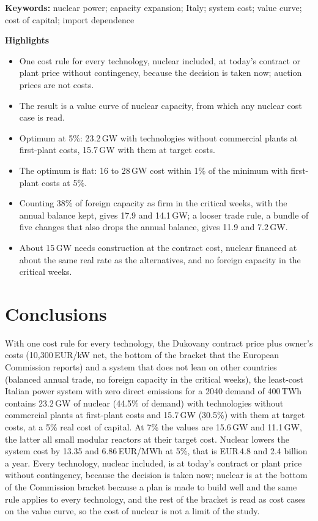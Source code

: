 \documentclass[11pt,a4paper]{article}
\begin{document}
\noindent\textbf{Keywords:} nuclear power; capacity expansion; Italy; system cost; value curve; cost of capital; import dependence

\medskip
\noindent\textbf{Highlights}
\begin{itemize}\setlength\itemsep{0pt}
\item One cost rule for every technology, nuclear included, at today's contract or plant price without contingency, because the decision is taken now; auction prices are not costs.
\item The result is a value curve of nuclear capacity, from which any nuclear cost case is read.
\item Optimum at 5\%: 23.2\,GW with technologies without commercial plants at first-plant costs, 15.7\,GW with them at target costs.
\item The optimum is flat: 16 to 28\,GW cost within 1\% of the minimum with first-plant costs at 5\%.
\item Counting 38\% of foreign capacity as firm in the critical weeks, with the annual balance kept, gives 17.9 and 14.1\,GW; a looser trade rule, a bundle of five changes that also drops the annual balance, gives 11.9 and 7.2\,GW.
\item About 15\,GW needs construction at the contract cost, nuclear financed at about the same real rate as the alternatives, and no foreign capacity in the critical weeks.
\end{itemize}






\section{Conclusions}\label{sec:conclusions}
With one cost rule for every technology, the Dukovany contract price plus owner's costs (10{,}300\,EUR/kW net, the bottom of the bracket that the European Commission reports) and a system that does not lean on other countries (balanced annual trade, no foreign capacity in the critical weeks), the least-cost Italian power system with zero direct emissions for a 2040 demand of 400\,TWh contains 23.2\,GW of nuclear (44.5\% of demand) with technologies without commercial plants at first-plant costs and 15.7\,GW (30.5\%) with them at target costs, at a 5\% real cost of capital. At 7\% the values are 15.6\,GW and 11.1\,GW, the latter all small modular reactors at their target cost. Nuclear lowers the system cost by 13.35 and 6.86\,EUR/MWh at 5\%, that is EUR\,4.8 and 2.4 billion a year. Every technology, nuclear included, is at today's contract or plant price without contingency, because the decision is taken now; nuclear is at the bottom of the Commission bracket because a plan is made to build well and the same rule applies to every technology, and the rest of the bracket is read as cost cases on the value curve, so the cost of nuclear is not a limit of the study.
\end{document}
